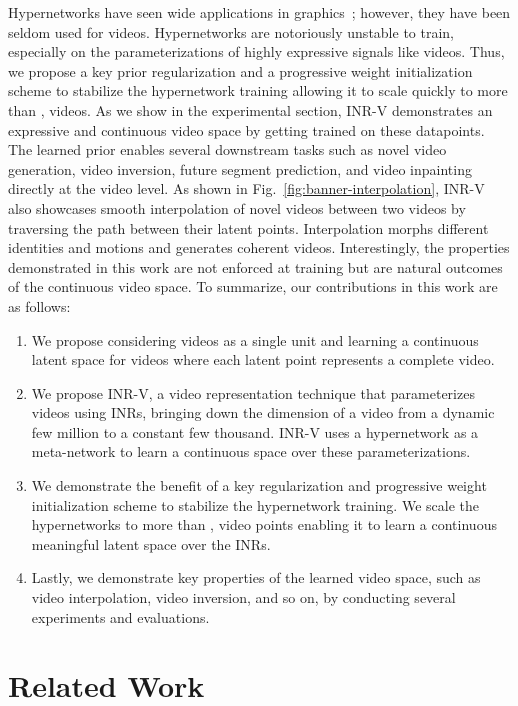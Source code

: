 \documentclass[10pt]{article} \usepackage[accepted]{tmlr}
\begin{document}
Hypernetworks have seen wide applications in graphics~\cite{siren, lfns, 3dhypernet1, 3dhypernet2}; however, they have been seldom used for videos. 
Hypernetworks are notoriously unstable \cite{} to train, especially on the parameterizations of highly expressive signals like videos. Thus, we propose a key prior regularization and a progressive weight initialization scheme to stabilize the hypernetwork training allowing it to scale quickly to more than , videos. As we show in the experimental section, INR-V demonstrates an expressive and continuous video space by getting trained on these datapoints. 
The learned prior enables several downstream tasks such as novel video generation, video inversion, future segment prediction, and video inpainting directly at the video level. As shown in Fig.~\ref{fig:banner-interpolation}, INR-V also showcases smooth interpolation of novel videos between two videos by traversing the path between their latent points. Interpolation morphs different identities and motions and generates coherent videos. Interestingly, the properties demonstrated in this work are not enforced at training but are natural outcomes of the continuous video space. 
To summarize, our contributions in this work are as follows: 
\begin{enumerate}
    \item We propose considering videos as a single unit and learning a continuous latent space for videos where each latent point represents a complete video. 
    \item We propose INR-V, a video representation technique that parameterizes videos using INRs, bringing down the dimension of a video from a dynamic few million to a constant few thousand. INR-V uses a hypernetwork as a meta-network to learn a continuous space over these parameterizations.
    \item We demonstrate the benefit of a key regularization and progressive weight initialization scheme to stabilize the hypernetwork training. We scale the hypernetworks to more than , video points enabling it to learn a continuous meaningful latent space over the INRs. 
    \item Lastly, we demonstrate key properties of the learned video space, such as video interpolation, video inversion, and so on, by conducting several experiments and evaluations. 
\end{enumerate}

\section{Related Work}
\label{related_work}
\end{document}

